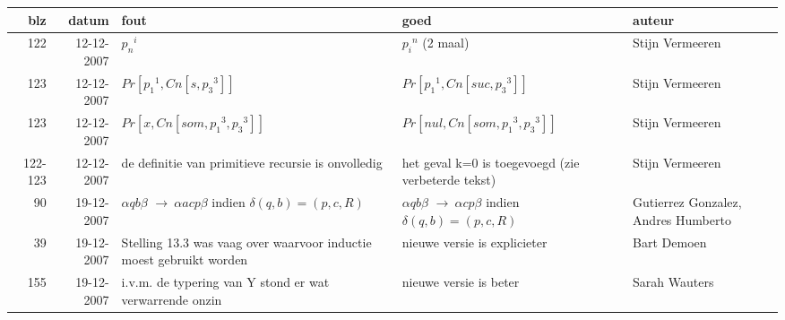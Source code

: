 \documentclass[11pt]{fund}
\newcommand{\rpijl}{$\rightarrow~$}
\begin{document}
\newpage
\begin{tabular}{|r|r|p{6cm}|p{6cm}|p{2cm}|}
\hline
blz & datum    & fout & goed  & auteur \\ \hline

\hline
122  &
12-12-2007  &
${p_n}^i$  &
${p_i}^n$  (2 maal) &
Stijn Vermeeren  \\ \hline

\hline
123  &
12-12-2007  &
$Pr[{p_1}^1,Cn[s,{p_3}^3]]$  &
$Pr[{p_1}^1,Cn[suc,{p_3}^3]]$  &
Stijn Vermeeren  \\ \hline

\hline
123  &
12-12-2007  &
$Pr[x,Cn[som,{p_1}^3, {p_3}^3]]$  &
$Pr[nul,Cn[som,{p_1}^3, {p_3}^3]]$  &
Stijn Vermeeren  \\ \hline

\hline
122-123 &
12-12-2007 &
de definitie van primitieve recursie is onvolledig &
het geval k=0 is toegevoegd (zie verbeterde tekst) &
Stijn Vermeeren  \\ \hline


\hline
90 &
19-12-2007 &
$\alpha q b \beta$ \rpijl $\alpha a c p \beta$ indien $\delta(q,b) = (p,c,R)$ &
$\alpha q b \beta$ \rpijl $\alpha c p \beta$ indien $\delta(q,b) = (p,c,R)$ &
Gutierrez Gonzalez, Andres Humberto  \\ \hline

\hline
39 &
19-12-2007 &
Stelling 13.3 was vaag over waarvoor inductie moest gebruikt worden &
nieuwe versie is explicieter &
Bart Demoen  \\ \hline

\hline
155 &
19-12-2007 &
i.v.m. de typering van Y stond er wat verwarrende onzin &
nieuwe versie is beter &
Sarah Wauters  \\ \hline


\end{tabular}
\end{document}
